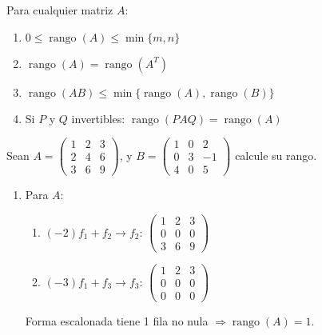 \begin{theorem}\label{thm:rango-prop}
Para cualquier matriz \( A \):
\begin{enumerate}
\item \( 0 \leq \operatorname{rango}(A) \leq \min\{m, n\} \)
\item \( \operatorname{rango}(A) = \operatorname{rango}(A^T) \)
\item \( \operatorname{rango}(AB) \leq \min\{\operatorname{rango}(A), \operatorname{rango}(B)\} \)
\item Si \( P \) y \( Q \) invertibles: \( \operatorname{rango}(PAQ) = \operatorname{rango}(A) \)
\end{enumerate}
\end{theorem}

\begin{example}
Sean \( A = \begin{pmatrix}
1 & 2 & 3 \\
2 & 4 & 6 \\
3 & 6 & 9 
\end{pmatrix} \), y \( B = \begin{pmatrix}
1 & 0 & 2 \\
0 & 3 & -1 \\
4 & 0 & 5 
\end{pmatrix} \) calcule su rango.
\begin{myproof}
\begin{enumerate}
\item Para $A:$
\begin{enumerate}
\item \( (-2)f_1 + f_2 \to f_2 \): \(\begin{pmatrix} 1 & 2 & 3 \\ 0 & 0 & 0 \\ 3 & 6 & 9 \end{pmatrix}\)
\item \( (-3)f_1 + f_3 \to f_3 \): \(\begin{pmatrix} \boxed{1} & 2 & 3 \\ 0 & 0 & 0 \\ 0 & 0 & 0 \end{pmatrix}\)
\end{enumerate}
Forma escalonada tiene 1 fila no nula \(\Rightarrow \operatorname{rango}(A) = 1\).


\end{enumerate}
\end{myproof}
\end{example}
